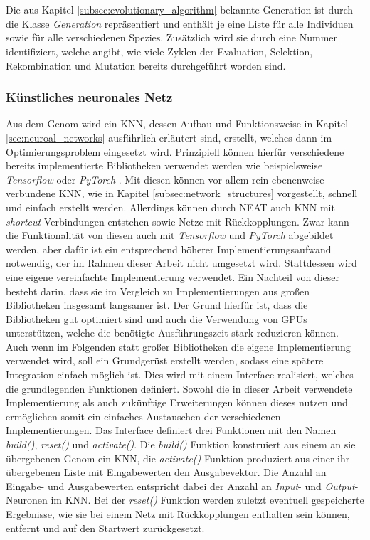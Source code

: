 \\\\
Die aus Kapitel \ref{subsec:evolutionary_algorithm} bekannte Generation ist durch die Klasse \emph{Generation} repräsentiert und enthält je eine Liste für alle Individuen sowie für alle verschiedenen Spezies. Zusätzlich wird sie durch eine Nummer identifiziert, welche angibt, wie viele Zyklen der Evaluation, Selektion, Rekombination und Mutation bereits durchgeführt worden sind.

\subsubsection{Künstliches neuronales Netz}
Aus dem Genom wird ein \ac{KNN}, dessen Aufbau und Funktionsweise in Kapitel \ref{sec:neuroal_networks} ausführlich erläutert sind, erstellt, welches dann im Optimierungsproblem eingesetzt wird. Prinzipiell können hierfür verschiedene bereits implementierte Bibliotheken verwendet werden wie beispielsweise \emph{Tensorflow} \cite{tensorflow2015} oder \emph{PyTorch} \cite{pytorch2019}. Mit diesen können vor allem rein ebenenweise verbundene \ac{KNN}, wie in Kapitel \ref{subsec:network_structures} vorgestellt, schnell und einfach erstellt werden. Allerdings können durch \ac{NEAT} auch \ac{KNN} mit \emph{shortcut} Verbindungen entstehen sowie Netze mit Rückkopplungen. Zwar kann die Funktionalität von diesen auch mit \emph{Tensorflow} und \emph{PyTorch} abgebildet werden, aber dafür ist ein entsprechend höherer Implementierungsaufwand notwendig, der im Rahmen dieser Arbeit nicht umgesetzt wird. Stattdessen wird eine eigene vereinfachte Implementierung verwendet. Ein Nachteil von dieser besteht darin, dass sie im Vergleich zu Implementierungen aus großen Bibliotheken insgesamt langsamer ist. Der Grund hierfür ist, dass die Bibliotheken gut optimiert sind und auch die Verwendung von \acp{GPU} unterstützen, welche die benötigte Ausführungszeit stark reduzieren können. Auch wenn im Folgenden statt großer Bibliotheken die eigene Implementierung verwendet wird, soll ein Grundgerüst erstellt werden, sodass eine spätere Integration einfach möglich ist. Dies wird mit einem Interface realisiert, welches die grundlegenden Funktionen definiert. Sowohl die in dieser Arbeit verwendete Implementierung als auch zukünftige Erweiterungen können dieses nutzen und ermöglichen somit ein einfaches Austauschen der verschiedenen Implementierungen. Das Interface definiert drei Funktionen mit den Namen \emph{build()}, \emph{reset()} und \emph{activate()}. Die \emph{build()} Funktion konstruiert aus einem an sie übergebenen Genom ein \ac{KNN}, die \emph{activate()} Funktion produziert aus einer ihr übergebenen Liste mit Eingabewerten den Ausgabevektor. Die Anzahl an Eingabe- und Ausgabewerten entspricht dabei der Anzahl an \emph{Input}- und \emph{Output}-Neuronen im \ac{KNN}. Bei der \emph{reset()} Funktion werden zuletzt eventuell gespeicherte Ergebnisse, wie sie bei einem Netz mit Rückkopplungen enthalten sein können, entfernt und auf den Startwert zurückgesetzt. 
